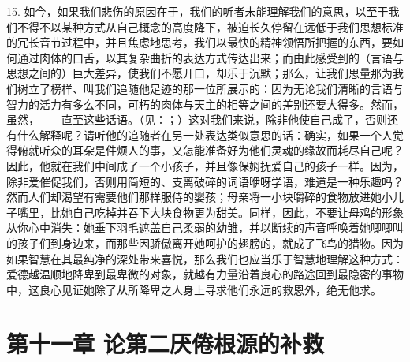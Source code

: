 15. 如今，如果我们悲伤的原因在于，我们的听者未能理解我们的意思，以至于我们不得不以某种方式从自己概念的高度降下，被迫长久停留在远低于我们思想标准的冗长音节过程中，并且焦虑地思考，我们以最快的精神领悟所把握的东西，要如何通过肉体的口舌，以其复杂曲折的表达方式传达出来；而由此感受到的（言语与思想之间的）巨大差异，使我们不愿开口，却乐于沉默；那么，让我们思量那为我们树立了榜样、叫我们追随他足迹的那一位所展示的：因为无论我们清晰的言语与智力的活力有多么不同，可朽的肉体与天主的相等之间的差别还要大得多。然而，虽然，——直至这些话语。（见：；）这对我们来说，除非他使自己成了，否则还有什么解释呢？请听他的追随者在另一处表达类似意思的话：确实，如果一个人觉得俯就听众的耳朵是件烦人的事，又怎能准备好为他们灵魂的缘故而耗尽自己呢？因此，他就在我们中间成了一个小孩子，并且像保姆抚爱自己的孩子一样。因为，除非爱催促我们，否则用简短的、支离破碎的词语咿呀学语，难道是一种乐趣吗？然而人们却渴望有需要他们那样服侍的婴孩；母亲将一小块嚼碎的食物放进她小儿子嘴里，比她自己吃掉并吞下大块食物更为甜美。同样，因此，不要让母鸡的形象从你心中消失：她垂下羽毛遮盖自己柔弱的幼雏，并以断续的声音呼唤着她唧唧叫的孩子们到身边来，而那些因骄傲离开她呵护的翅膀的，就成了飞鸟的猎物。因为如果智慧在其最纯净的深处带来喜悦，那么我们也应当乐于智慧地理解这种方式：爱德越温顺地降卑到最卑微的对象，就越有力量沿着良心的路途回到最隐密的事物中，这良心见证她除了从所降卑之人身上寻求他们永远的救恩外，绝无他求。\par


\section{第十一章 论第二厌倦根源的补救}

